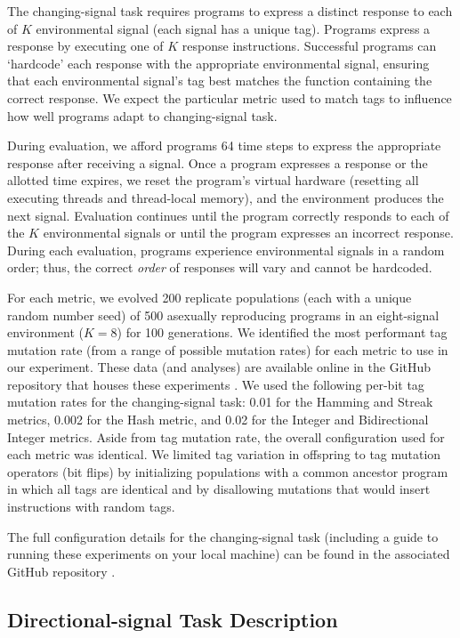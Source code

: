 The changing-signal task requires programs to express a distinct response to each of $K$ environmental signal (each signal has a unique tag).
Programs express a response by executing one of $K$ response instructions.
Successful programs can `hardcode' each response with the appropriate environmental signal, ensuring that each environmental signal's tag best matches the function containing the correct response.
We expect the particular metric used to match tags to influence how well programs adapt to changing-signal task.

During evaluation, we afford programs 64 time steps to express the appropriate response after receiving a signal.
Once a program expresses a response or the allotted time expires, we reset the program's virtual hardware (resetting all executing threads and thread-local memory), and the environment produces the next signal.
Evaluation continues until the program correctly responds to each of the $K$ environmental signals or until the program expresses an incorrect response.
During each evaluation, programs experience environmental signals in a random order; thus, the correct \textit{order} of responses will vary and cannot be hardcoded.

For each metric, we evolved 200 replicate populations (each with a unique random number seed) of 500 asexually reproducing programs in an eight-signal environment ($K=8$) for 100 generations.
We identified the most performant tag mutation rate (from a range of possible mutation rates) for each metric to use in our experiment.
These data (and analyses) are available online in the GitHub repository that houses these experiments .
We used the following per-bit tag mutation rates for the changing-signal task: 0.01 for the Hamming and Streak metrics, 0.002 for the Hash metric, and 0.02 for the Integer and Bidirectional Integer metrics.
Aside from tag mutation rate, the overall configuration used for each metric was identical.
We limited tag variation in offspring to tag mutation operators (bit flips) by initializing populations with a common ancestor program in which all tags are identical and by disallowing mutations that would insert instructions with random tags.

The full configuration details for the changing-signal task (including a guide to running these experiments on your local machine) can be found in the associated GitHub repository .

\subsection{Directional-signal Task Description}

